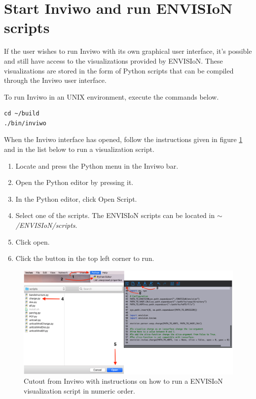 \section{Start Inviwo and run ENVISIoN scripts}
If the user wishes to run Inviwo with its own graphical user interface, it's possible and still have access to the visualizations provided by ENVISIoN. These visualizations are stored in the form of Python scripts that can be compiled through the Inviwo user interface.

To run Inviwo in an UNIX environment, execute the commands below.

\begin{lstlisting}[frame = single, breaklines=true]
cd ~/build
./bin/inviwo
\end{lstlisting}

When the Inviwo interface has opened, follow the instructions given in figure \ref{fig:Inviwo} and in the list below to run a visualization script.

\begin{enumerate}
\item Locate and press the Python menu in the Inviwo bar.
\item Open the Python editor by pressing it.
\item In the Python editor, click Open Script.
\item Select one of the scripts. The ENVISIoN scripts can be located in \emph{$\sim$/ENVISIoN/scripts}.
\item Click open.
\item Click the button in the top left corner to run.
\end{enumerate}

\begin{figure}[ht]
    \centering
    \includegraphics[angle=0, width=\linewidth]{images/completeInviwo.png}
    \caption{Cutout from Inviwo with instructions on how to run a ENVISIoN visualization script in numeric order.}
    \label{fig:Inviwo}
\end{figure}

